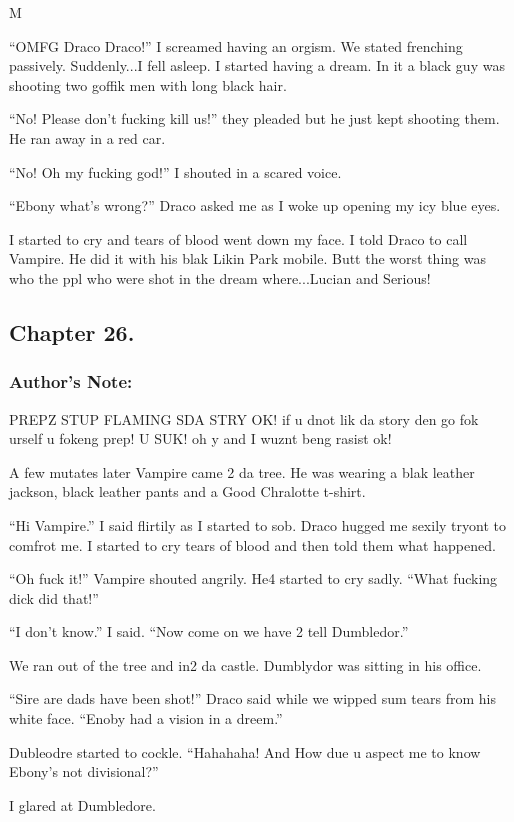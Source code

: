 M\documentclass{article}
\begin{document}
“OMFG Draco Draco!” I screamed having an orgism. We stated frenching passively. Suddenly...I fell asleep. I started having a dream. In it a black guy was shooting two goffik men with long black hair.

“No! Please don’t fucking kill us!” they pleaded but he just kept shooting them. He ran away in a red car.

“No! Oh my fucking god!” I shouted in a scared voice.

“Ebony what’s wrong?” Draco asked me as I woke up opening my icy blue eyes.

I started to cry and tears of blood went down my face. I told Draco to call Vampire. He did it with his blak Likin Park mobile. Butt the worst thing was who the ppl who were shot in the dream where...Lucian and Serious!

\clearpage\nolinenumbers
\subsection*{Chapter 26.}

\subsubsection*{Author's Note: }PREPZ STUP FLAMING SDA STRY OK! if u dnot lik da story den go fok urself u fokeng prep! U SUK! oh y and I wuznt beng rasist ok!

\textbreak
\linenumbers\resetlinenumber

A few mutates later Vampire came 2 da tree. He was wearing a blak leather jackson, black leather pants and a Good Chralotte t-shirt.

“Hi Vampire.” I said flirtily as I started to sob. Draco hugged me sexily tryont to comfrot me. I started to cry tears of blood and then told them what happened.

“Oh fuck it!” Vampire shouted angrily. He4 started to cry sadly. “What fucking dick did that!”

“I don’t know.” I said. “Now come on we have 2 tell Dumbledor.”

We ran out of the tree and in2 da castle. Dumblydor was sitting in his office.

“Sire are dads have been shot!” Draco said while we wipped sum tears from his white face. “Enoby had a vision in a dreem.”

Dubleodre started to cockle. “Hahahaha! And How due u aspect me to know Ebony’s not divisional?”

I glared at Dumbledore.
\end{document}
